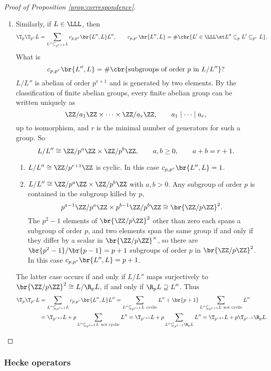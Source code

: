 \begin{proof}[Proof of Proposition \ref{prop:correspondence}]
\begin{enumerate}
\item Similarly, if $ L \in \LLL $, then
$$ \T_p\T_{p^r}L = \sum_{L'' \subseteq_{p^{r + 1}} L} c_{p, p^r}\br{L'', L}L'', \qquad c_{p, p^r}\br{L'', L} = \#\cbr{L' \in \LLL \st L'' \subseteq_p L' \subseteq_{p^r} L}. $$
What is
$$ c_{p, p^r}\br{L'', L} = \#\cbr{\text{subgroups of order} \ p \ \text{in} \ L / L''}? $$
$ L / L'' $ is abelian of order $ p^{r + 1} $ and is generated by two elements. By the classification of finite abelian groups, every finite abelian group can be written uniquely as
$$ \ZZ / a_1\ZZ \times \dots \times \ZZ / a_r\ZZ, \qquad a_1 \mid \dots \mid a_r, $$
up to isomorphism, and $ r $ is the minimal number of generators for such a group. So
$$ L / L'' \cong \ZZ / p^a\ZZ \times \ZZ / p^b\ZZ, \qquad a, b \ge 0, \qquad a + b = r + 1. $$
\begin{enumerate}[leftmargin=0.5in, label=Case \arabic*.]
\item $ L / L'' \cong \ZZ / p^{r + 1}\ZZ $ is cyclic. In this case $ c_{p, p^r}\br{L'', L} = 1 $.
\item $ L / L'' \cong \ZZ / p^a\ZZ \times \ZZ / p^b\ZZ $ with $ a, b > 0 $. Any subgroup of order $ p $ is contained in the subgroup killed by $ p $,
$$ p^{a - 1}\ZZ / p^a\ZZ \times p^{b - 1}\ZZ / p^b\ZZ \cong \br{\ZZ / p\ZZ}^2. $$
The $ p^2 - 1 $ elements of $ \br{\ZZ / p\ZZ}^2 $ other than zero each spans a subgroup of order $ p $, and two elements span the same group if and only if they differ by a scalar in $ \br{\ZZ / p\ZZ}^\times $, so there are $ \br{p^2 - 1} / \br{p - 1} = p + 1 $ subgroups of order $ p $ in $ \br{\ZZ / p\ZZ}^2 $. In this case $ c_{p, p^r}\br{L'', L} = p + 1 $.
\end{enumerate}
The latter case occurs if and only if $ L / L'' $ maps surjectively to $ \br{\ZZ / p\ZZ}^2 \cong L / \R_pL $, if and only if $ \R_pL \supseteq L'' $. Thus
\begin{align*}
\T_p\T_{p^r}L
& = \sum_{L'' \subseteq_{p^{r + 1}} L} c_{p, p^r}\br{L'', L}L''
= \sum_{L'' \subseteq_{p^{r + 1}} L \ \text{cyclic}} L'' + \br{p + 1}\sum_{L'' \subseteq_{p^{r + 1}} L \ \text{not cyclic}} L'' \\
& = \T_{p^{r + 1}}L + p\sum_{L'' \subseteq_{p^{r + 1}} L \ \text{not cyclic}} L''
= \T_{p^{r + 1}}L + p\sum_{L'' \subseteq_{p^{r - 1}} \R_pL} L''
= \T_{p^{r + 1}}L + p\T_{p^{r - 1}}\R_pL.
\end{align*}
\end{enumerate}
\end{proof}

\subsubsection{Hecke operators}


